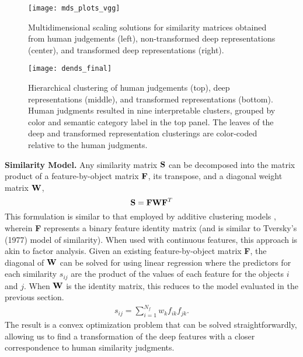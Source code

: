\documentclass[10pt,letterpaper]{article}
\begin{document}
%
\begin{figure*}[!ht]
\begin{center}
\texttt{[image: mds\_plots\_vgg]}
\end{center}
\vspace{-5px}
\caption{Multidimensional scaling solutions for similarity matrices obtained from human judgements (left), non-transformed deep representations (center), and transformed deep representations (right).}
\label{mds-plots}
\end{figure*}


\begin{figure*}[!ht]
\begin{center}
\texttt{[image: dends\_final]}
\end{center}
\vspace{-5px}
\caption{Hierarchical clustering of human judgements (top), deep representations (middle), and transformed representations (bottom). Human judgments resulted in nine interpretable clusters, grouped by color and semantic category label in the top panel. The leaves of the deep and transformed representation clusterings are color-coded relative to the human judgments.}
\label{dend-plots}
\end{figure*}

\noindent \textbf{Similarity Model.} Any similarity matrix ${\bf S}$ can be decomposed into the matrix product of a feature-by-object matrix ${\bf F}$, its transpose, and a diagonal weight matrix ${\bf W}$,
\begin{equation}{\bf S} = {\bf F}{\bf W} {\bf F}^T
\end{equation}
This formulation is similar to that employed by additive clustering models \citep*{shepard1979additive}, wherein {\bf F} represents a binary feature identity matrix (and is similar to Tversky's (1977) model of similarity). When used with continuous features, this approach is akin to factor analysis. Given an existing feature-by-object matrix {\bf F}, the diagonal of ${\bf W}$ can be solved for using linear regression where the predictors for each similarity $s_{ij}$ are the product of the values of each feature for the objects $i$ and $j$. When ${\bf W}$ is the identity matrix, this reduces to the model evaluated in the previous section.
\begin{equation}
  \label{eq:u}
  \begin{gathered}
\displaystyle s_{ij} = \sum_{i=1}^{N_{f}} w_{k}f_{ik}f_{jk} .
 \end{gathered}
 \end{equation}
The result is a convex optimization problem that can be solved straightforwardly, allowing us to find a transformation of the deep features with a closer correspondence to human similarity judgments. \\
\end{document}
